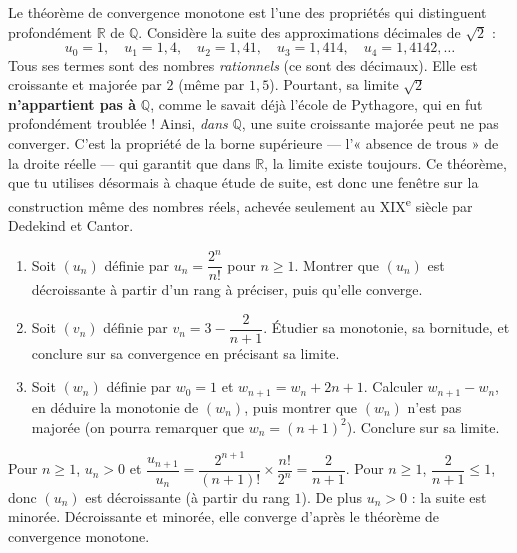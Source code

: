 \documentclass[11pt]{article}
\begin{document}
\begin{savaistu}
Le théorème de convergence monotone est l'une des propriétés qui distinguent profondément $\mathbb{R}$ de $\mathbb{Q}$. Considère la suite des approximations décimales de $\sqrt{2}$ :
\[ u_0 = 1, \quad u_1 = 1{,}4, \quad u_2 = 1{,}41, \quad u_3 = 1{,}414, \quad u_4 = 1{,}4142, \dots \]
Tous ses termes sont des nombres \emph{rationnels} (ce sont des décimaux). Elle est croissante et majorée par $2$ (même par $1{,}5$). Pourtant, sa limite $\sqrt{2}$ \textbf{n'appartient pas à} $\mathbb{Q}$, comme le savait déjà l'école de Pythagore, qui en fut profondément troublée ! Ainsi, \emph{dans} $\mathbb{Q}$, une suite croissante majorée peut ne pas converger. C'est la propriété de la borne supérieure — l'« absence de trous » de la droite réelle — qui garantit que dans $\mathbb{R}$, la limite existe toujours. Ce théorème, que tu utilises désormais à chaque étude de suite, est donc une fenêtre sur la construction même des nombres réels, achevée seulement au XIX\textsuperscript{e} siècle par Dedekind et Cantor.
\end{savaistu}

\begin{exercice}
\begin{enumerate}
\item Soit $(u_n)$ définie par $u_n = \dfrac{2^n}{n!}$ pour $n \geq 1$. Montrer que $(u_n)$ est décroissante à partir d'un rang à préciser, puis qu'elle converge.
\item Soit $(v_n)$ définie par $v_n = 3 - \dfrac{2}{n+1}$. Étudier sa monotonie, sa bornitude, et conclure sur sa convergence en précisant sa limite.
\item Soit $(w_n)$ définie par $w_0 = 1$ et $w_{n+1} = w_n + 2n + 1$. Calculer $w_{n+1} - w_n$, en déduire la monotonie de $(w_n)$, puis montrer que $(w_n)$ n'est pas majorée (on pourra remarquer que $w_n = (n+1)^2$). Conclure sur sa limite.
\end{enumerate}
\end{exercice}

\begin{corrige}[Exercice n°1]
Pour $n \geq 1$, $u_n > 0$ et $\dfrac{u_{n+1}}{u_n} = \dfrac{2^{n+1}}{(n+1)!} \times \dfrac{n!}{2^n} = \dfrac{2}{n+1}$. Pour $n \geq 1$, $\dfrac{2}{n+1} \leq 1$, donc $(u_n)$ est décroissante (à partir du rang $1$). De plus $u_n > 0$ : la suite est minorée. Décroissante et minorée, elle converge d'après le théorème de convergence monotone.
\end{corrige}
\end{document}

